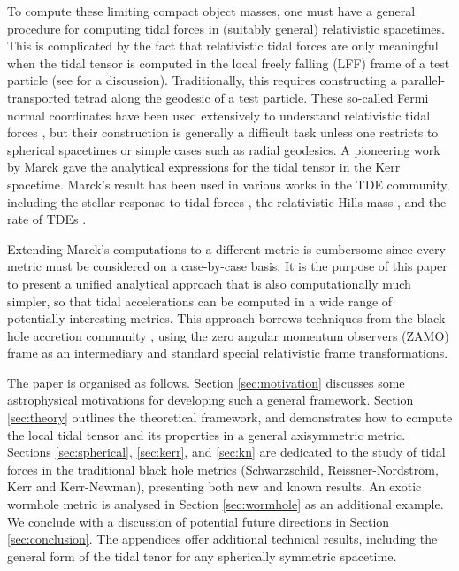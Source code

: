 \documentclass[
    reprint,
    prd,
    nofootinbib,
    amsmath,amssymb,
    aps,
    floatfix,
]{revtex4-2}
\begin{document}
To compute these limiting compact object masses, one must have a general procedure for computing tidal forces in (suitably general) relativistic spacetimes. This is complicated by the fact that relativistic tidal forces are only meaningful when the tidal tensor is computed in the local freely falling (LFF) frame of a test particle (see \cite{Pirani2009} for a discussion). Traditionally, this requires constructing a parallel-transported tetrad along the geodesic of a test particle. These so-called Fermi normal coordinates \cite{Manasse1963} have been used extensively to understand relativistic tidal forces \cite{Ishii2005,Cheng2013,Banerjee2018}, but their construction is generally a difficult task unless one restricts to spherical spacetimes or simple cases such as radial geodesics. A pioneering work by Marck \cite{Marck1983} gave the analytical expressions for the tidal tensor in the Kerr spacetime. Marck's result has been used in various works in the TDE community, including the stellar response to tidal forces \cite{Ivanov2001}, the relativistic Hills mass \cite{Mummery2023}, and the rate of TDEs \cite{Kesden2012}.

Extending Marck's computations to a different metric is cumbersome since every metric must be considered on a case-by-case basis. It is the purpose of this paper to present a unified analytical approach that is also computationally much simpler, so that tidal accelerations can be computed in a wide range of potentially interesting metrics. This approach borrows techniques from the black hole accretion community \citep{Thorne1974, Dauser2013, Ingram19}, using the zero angular momentum observers (ZAMO) frame \cite{Bardeen72} as an intermediary and standard special relativistic frame transformations. 

The paper is organised as follows. Section \ref{sec:motivation} discusses some astrophysical motivations for developing such a general framework. Section \ref{sec:theory} outlines the theoretical framework, and demonstrates how to compute the local tidal tensor and its properties in a general axisymmetric metric. Sections \ref{sec:spherical}, \ref{sec:kerr}, and \ref{sec:kn} are dedicated to the study of tidal forces in the traditional black hole metrics (Schwarzschild, Reissner-Nordström, Kerr and Kerr-Newman), presenting both new and known results. An exotic wormhole metric is analysed in Section \ref{sec:wormhole} as an additional example. We conclude with a discussion of potential future directions in Section \ref{sec:conclusion}. The appendices offer additional technical results, including the general form of the tidal tenor for any spherically symmetric spacetime.
\end{document}

